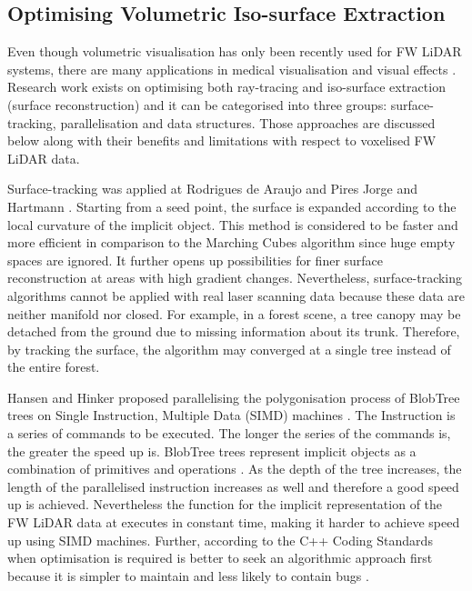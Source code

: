 \documentclass{subfiles}
\begin{document}
\subsection{Optimising Volumetric Iso-surface Extraction}
\par Even though volumetric visualisation has only been recently used for FW LiDAR systems, there are many applications in medical visualisation \cite{Levoy1998} \cite{Hadwiger2012} and visual effects \cite{Crassin2009} \cite{Laine2011SparseOctrees}. Research work exists on optimising both ray-tracing and iso-surface extraction (surface reconstruction) and it can be categorised into three groups: surface-tracking, parallelisation and data structures. Those approaches are discussed below along with their benefits and limitations with respect to voxelised FW LiDAR data.

\par Surface-tracking was applied at Rodrigues de Araujo and Pires Jorge \cite{Rodrigues2005} and Hartmann \cite{Hartmann1998}. Starting from a seed point, the surface is expanded according to the local curvature of the implicit object. This method is considered to be faster and more efficient in comparison to the Marching Cubes algorithm since huge empty spaces are ignored. It further opens up possibilities for finer surface reconstruction at areas with high gradient changes. Nevertheless, surface-tracking algorithms cannot be applied with real laser scanning data because these data are neither manifold nor closed. For example, in a forest scene, a tree canopy may be detached from the ground due to missing information about its trunk. Therefore, by tracking the surface, the algorithm may converged at a single tree instead of the entire forest.  

\par Hansen and Hinker proposed parallelising the polygonisation process of BlobTree trees on Single Instruction, Multiple Data (SIMD) machines \cite{Hansen1992}. {\color{blue}The Instruction is a series of commands to be executed. The longer the series of the commands is, the greater the speed up is. BlobTree trees represent implicit objects as a combination of primitives and operations \cite{Galbraith2004}. As the depth of the tree increases, the length of the parallelised instruction increases as well and therefore a good speed up is achieved}. Nevertheless the function for the implicit representation of the FW LiDAR data at \cite{Miltiadou2014} executes in constant time, making it harder to achieve speed up using SIMD machines. Further, according to the C++ Coding Standards when optimisation is required is better to seek an algorithmic approach first because it is simpler to maintain and less likely to contain bugs \cite{Sutter2004}. 
\end{document}
